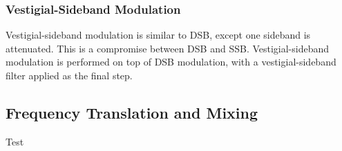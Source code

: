 \documentclass[]{article}
\begin{document}
\subsubsection{Vestigial-Sideband Modulation}
Vestigial-sideband modulation is similar to DSB, except one sideband is attenuated. This is a compromise between DSB and SSB. Vestigial-sideband modulation is performed on top of DSB modulation, with a vestigial-sideband filter applied as the final step.
\subsection{Frequency Translation and Mixing}
Test




\end{document}
